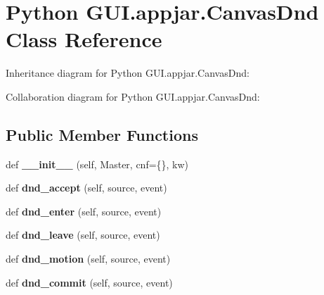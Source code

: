 \hypertarget{class_python_01_g_u_i_1_1appjar_1_1_canvas_dnd}{}\section{Python G\+U\+I.\+appjar.\+Canvas\+Dnd Class Reference}
\label{class_python_01_g_u_i_1_1appjar_1_1_canvas_dnd}


Inheritance diagram for Python G\+U\+I.\+appjar.\+Canvas\+Dnd\+:


Collaboration diagram for Python G\+U\+I.\+appjar.\+Canvas\+Dnd\+:
\subsection*{Public Member Functions}
\begin{DoxyCompactItemize}
\item 
\mbox{\label{class_python_01_g_u_i_1_1appjar_1_1_canvas_dnd_ab07811c3f1e814913156d1fc29939117}} 
def {\bfseries \+\_\+\+\_\+init\+\_\+\+\_\+} (self, Master, cnf=\{\}, kw)
\item 
\mbox{\label{class_python_01_g_u_i_1_1appjar_1_1_canvas_dnd_a3ba92c3bc825261e8d644a80b827bf41}} 
def {\bfseries dnd\+\_\+accept} (self, source, event)
\item 
\mbox{\label{class_python_01_g_u_i_1_1appjar_1_1_canvas_dnd_af58fb4a75e8813a841544a7f4028ac62}} 
def {\bfseries dnd\+\_\+enter} (self, source, event)
\item 
\mbox{\label{class_python_01_g_u_i_1_1appjar_1_1_canvas_dnd_a8a33b2633ab738fbe58d40ebbf5e1afd}} 
def {\bfseries dnd\+\_\+leave} (self, source, event)
\item 
\mbox{\label{class_python_01_g_u_i_1_1appjar_1_1_canvas_dnd_a7ad4adb55375ccff651db89f01bd9b78}} 
def {\bfseries dnd\+\_\+motion} (self, source, event)
\item 
\mbox{\label{class_python_01_g_u_i_1_1appjar_1_1_canvas_dnd_a1dd05153f75de51a2cf8b6a3a1f63024}} 
def {\bfseries dnd\+\_\+commit} (self, source, event)
\end{DoxyCompactItemize}


